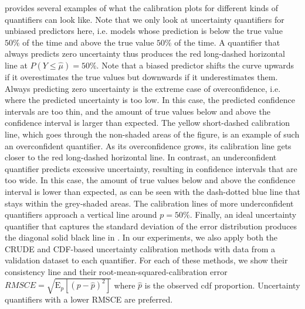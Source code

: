  provides several examples of what the calibration plots for different kinds of quantifiers can look like. Note that we only look at uncertainty quantifiers for unbiased predictors here, i.e. models whose prediction is below the true value $50\%$ of the time and above the true value $50\%$ of the time. A quantifier that always predicts zero uncertainty thus produces the red long-dashed horizontal line at $P(Y \leq \hat{\mu}) = 50\%$. Note that a biased predictor shifts the curve upwards if it overestimates the true values but downwards if it underestimates them. Always predicting zero uncertainty is the extreme case of overconfidence, i.e. where the predicted uncertainty is too low. In this case, the predicted confidence intervals are too thin, and the amount of true values below and above the confidence interval is larger than expected. The yellow short-dashed calibration line, which goes through the non-shaded areas of the figure, is an example of such an overconfident quantifier. As its overconfidence grows, its calibration line gets closer to the red long-dashed horizontal line. In contrast, an underconfident quantifier predicts excessive uncertainty, resulting in confidence intervals that are too wide. In this case, the amount of true values below and above the confidence interval is lower than expected, as can be seen with the dash-dotted blue line that stays within the grey-shaded areas. The calibration lines of more underconfident quantifiers approach a vertical line around $p = 50\%$. Finally, an ideal uncertainty quantifier that captures the standard deviation of the error distribution produces the diagonal solid black line in . In our experiments, we also apply both the CRUDE \cite{not-crude-uncertainty-2020, uncertainty-metrics-2023} and CDF-based \cite{uncertainty-calibration-2018, uncertainty-metrics-2023} uncertainty calibration methods with data from a validation dataset to each quantifier. For each of these methods, we show their consistency line and their root-mean-squared-calibration error $RMSCE = \sqrt{\text{E}_{p}[(p - \hat{p})^2]}$ where $\hat{p}$ is the observed cdf proportion. Uncertainty quantifiers with a lower RMSCE are preferred.

